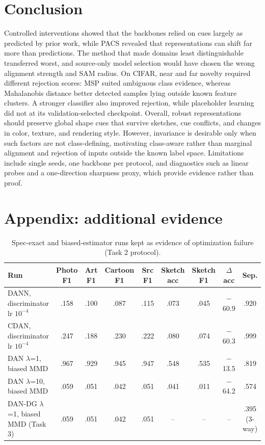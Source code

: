 \documentclass{article}
\begin{document}
\section{Conclusion}
Controlled interventions showed that the backbones relied on cues largely as predicted by prior work, while PACS revealed that representations can shift far more than predictions. The method that made domains least distinguishable transferred worst, and source-only model selection would have chosen the wrong alignment strength and SAM radius. On CIFAR, near and far novelty required different rejection scores: MSP suited ambiguous class evidence, whereas Mahalanobis distance better detected samples lying outside known feature clusters. A stronger classifier also improved rejection, while placeholder learning did not at its validation-selected checkpoint. Overall, robust representations should preserve global shape cues that survive sketches, cue conflicts, and changes in color, texture, and rendering style. However, invariance is desirable only when such factors are not class-defining, motivating class-aware rather than marginal alignment and rejection of inputs outside the known label space. Limitations include single seeds, one backbone per protocol, and diagnostics such as linear probes and a one-direction sharpness proxy, which provide evidence rather than proof.


\newpage


\appendix
\section{Appendix: additional evidence}
\begin{table}[h]
\centering\small
\caption{Spec-exact and biased-estimator runs kept as evidence of optimization failure (Task 2 protocol).}
\label{tab:unstable}
\setlength{\tabcolsep}{4pt}
\begin{tabular}{@{}lcccccccc@{}}
\toprule
Run & Photo F1 & Art F1 & Cartoon F1 & Src F1 & Sketch acc & Sketch F1 & $\Delta$acc & Sep. \\
\midrule
DANN, discriminator lr $10^{-4}$ & .158 & .100 & .087 & .115 & .073 & .045 & $-$60.9 & .920 \\
CDAN, discriminator lr $10^{-4}$ & .247 & .188 & .230 & .222 & .080 & .074 & $-$60.3 & .999 \\
DAN $\lambda$=1, biased MMD & .967 & .929 & .945 & .947 & .548 & .535 & $-$13.5 & .819 \\
DAN $\lambda$=10, biased MMD & .059 & .051 & .042 & .051 & .041 & .011 & $-$64.2 & .574 \\
DAN-DG $\lambda$=1, biased MMD (Task 3) & .059 & .051 & .042 & .051 & -- & -- & -- & .395 (3-way) \\
\bottomrule
\end{tabular}
\end{table}
\end{document}
